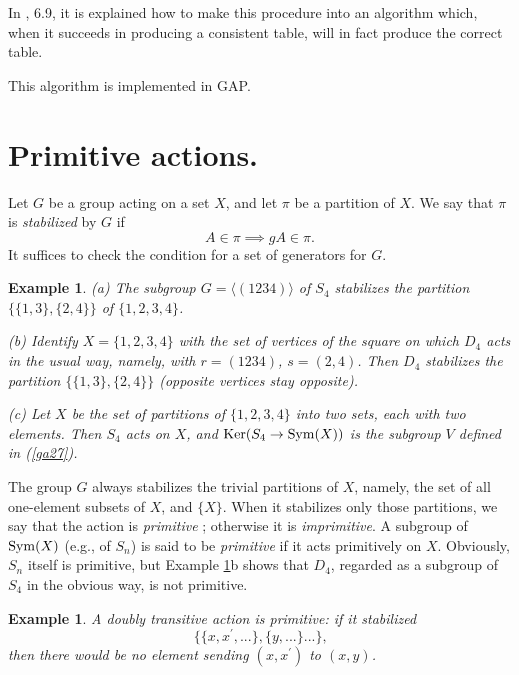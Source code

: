 \documentclass[a4paper,11pt,final]{memoir}%
\newtheorem{example}[X]{Example}
\theoremstyle{nonumberplain}
\begin{document}
In \cite{artin1991}, 6.9, it is explained how to make this procedure into an
algorithm which, when it succeeds in producing a consistent table, will in
fact produce the correct table.

This algorithm is implemented in GAP.

\section{Primitive actions.}

Let $G$ be a group acting on a set $X$, and let $\pi$ be a partition of $X$.
We say that $\pi$ is \emph{stabilized\/}%
by $G$ if
\[
A\in\pi\implies gA\in\pi.
\]
It suffices to check the condition for a set of generators for $G$.

\begin{example}
\label{ga34} (a) The subgroup $G=\langle(1234)\rangle$ of $S_{4}$ stabilizes
the partition $\{\{1,3\},\{2,4\}\}$ of $\{1,2,3,4\}$.

(b) Identify $X=\{1,2,3,4\}$ with the set of vertices of the square on which
$D_{4}$ acts in the usual way, namely, with $r=(1234)$, $s=(2,4)$. Then
$D_{4}$ stabilizes the partition $\{\{1,3\},\{2,4\}\}$ (opposite vertices stay opposite).

(c) Let $X$ be the set of partitions of $\{1,2,3,4\}$ into two sets, each with
two elements. Then $S_{4}$ acts on $X$, and $\operatorname{Ker}(S_{4}\rightarrow\operatorname{Sym}(X))$ is
the subgroup $V$ defined in (\ref{ga27}).
\end{example}

The group $G$ always stabilizes the trivial partitions of $X$, namely, the set
of all one-element subsets of $X$, and $\{X\}$. When it stabilizes only those
partitions, we say that the action is \emph{primitive}%
%
; otherwise it is \emph{imprimitive}.%
A subgroup of $\operatorname{Sym}(X)$ (e.g., of $S_{n}$) is said to be \emph{primitive\/}%
if it acts primitively on $X$. Obviously, $S_{n}$ itself is primitive, but
Example \ref{ga34}b shows that $D_{4}$, regarded as a subgroup of $S_{4}$ in
the obvious way, is not primitive.

\begin{example}
\label{ga35} A doubly transitive action is primitive: if it stabilized
\[
\{\{x,x^{\prime},...\},\{y,...\}...\}\text{,}%
\]
then there would be no element sending $(x,x^{\prime})$ to $(x,y)$.
\end{example}
\end{document}
